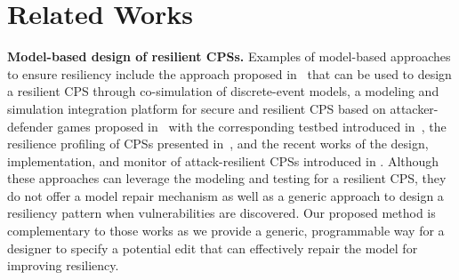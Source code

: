 \section{Related Works}
%
%
%
%
%

\vspace{0.5em}
\noindent
{\bf Model-based design of resilient CPSs.} Examples of model-based approaches to ensure resiliency include the approach proposed in~\cite{fitzgerald2012rigorous} that can be used to design a resilient CPS through co-simulation of discrete-event models, a modeling and simulation integration platform for secure and resilient CPS based on attacker-defender games proposed in~\cite{koutsoukos2018sure} with the corresponding testbed introduced in~\cite{neema2018integrated}, the resilience profiling of CPSs presented in~\cite{jackson28resilience}, and the recent works of the design, implementation, and monitor of attack-resilient CPSs introduced in \cite{weimer2018parameter,pajic2017design}.   
%
Although these approaches can leverage the modeling and testing for a resilient CPS, they do not offer a model repair mechanism as well as a generic approach to design a resiliency pattern when vulnerabilities are discovered. Our proposed method is complementary to those works as we provide a generic, programmable way for a designer to specify a potential edit that can effectively repair the model for improving resiliency.

